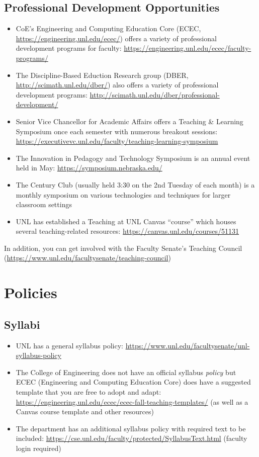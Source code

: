 \documentclass[12pt]{scrartcl}
\begin{document}
\subsection{Professional Development Opportunities}

\begin{itemize}
  \item CoE's Engineering and Computing Education Core (ECEC,
  \url{https://engineering.unl.edu/ecec/})   
  offers a variety of professional development programs for
  faculty: \url{https://engineering.unl.edu/ecec/faculty-programs/}
  \item The Discipline-Based Eduction Research group (DBER, \url{http://scimath.unl.edu/dber/}) also offers a variety of professional
  development programs: \url{http://scimath.unl.edu/dber/professional-development/}
  \item Senior Vice Chancellor for Academic Affairs offers a 
  Teaching \& Learning Symposium once each semester with numerous
  breakout sessions: \url{https://executivevc.unl.edu/faculty/teaching-learning-symposium}
  \item The Innovation in Pedagogy and Technology Symposium is an 
  annual event held in May: \url{https://symposium.nebraska.edu/}
  \item The Century Club (usually held 3:30 on the 2nd Tuesday of
  each month) is a monthly symposium on various technologies and
  techniques for larger classroom settings
  \item UNL has established a Teaching at UNL Canvas ``course''
  which houses several teaching-related resources: \url{https://canvas.unl.edu/courses/51131}
\end{itemize}

In addition, you can get involved with the Faculty Senate's
Teaching Council (\url{https://www.unl.edu/facultysenate/teaching-council})

\section{Policies}

\subsection{Syllabi}

\begin{itemize}
  \item UNL has a general syllabus policy: \url{https://www.unl.edu/facultysenate/unl-syllabus-policy}
  \item The College of Engineering does not have an official syllabus \emph{policy} but ECEC (Engineering and Computing Education Core) does have a suggested template that you are free to adopt and adapt: \url{https://engineering.unl.edu/ecec/ecec-fall-teaching-templates/} (as well as a Canvas course template and other resources)
  \item The department has an additional syllabus policy with required text to be included: 
\url{https://cse.unl.edu/faculty/protected/SyllabusText.html} (faculty login required) 
\end{itemize}
 
\end{document}
